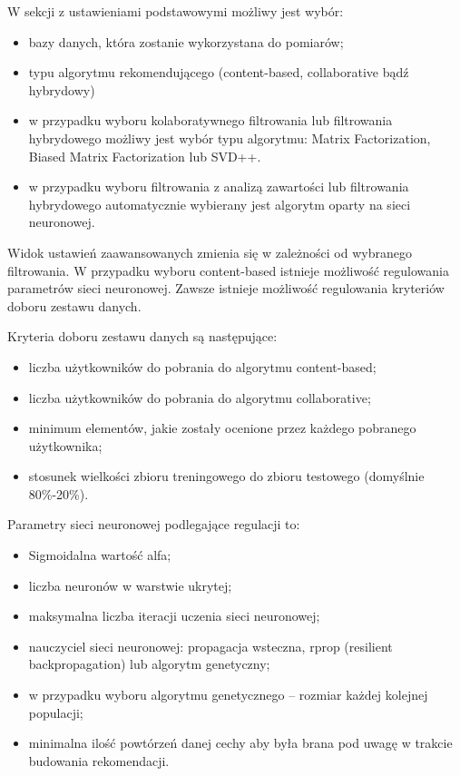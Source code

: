 \documentclass[twoside]{iisthesis}
\begin{document}
		W sekcji z ustawieniami podstawowymi możliwy jest wybór:
		\begin{itemize}
			\item bazy danych, która zostanie wykorzystana do pomiarów;
			\item typu algorytmu rekomendującego (content-based, collaborative bądź hybrydowy)
			\item w przypadku wyboru kolaboratywnego filtrowania lub filtrowania hybrydowego możliwy jest wybór typu algorytmu: Matrix Factorization, Biased Matrix Factorization lub SVD++.
			\item w przypadku wyboru filtrowania z analizą zawartości lub filtrowania hybrydowego automatycznie wybierany jest algorytm oparty na sieci neuronowej. 
		\end{itemize}
		 
		 Widok ustawień zaawansowanych zmienia się w zależności od wybranego filtrowania. W przypadku wyboru content-based istnieje możliwość regulowania parametrów sieci neuronowej. Zawsze istnieje możliwość regulowania kryteriów doboru zestawu danych.
		 
		 Kryteria doboru zestawu danych są następujące:
		 
		 \begin{itemize}
		 	\item liczba użytkowników do pobrania do algorytmu content-based;
		 	\item liczba użytkowników do pobrania do algorytmu collaborative;
		 	\item minimum elementów, jakie zostały ocenione przez każdego pobranego użytkownika;
		 	\item stosunek wielkości zbioru treningowego do zbioru testowego (domyślnie 80\%-20\%).
		 \end{itemize}
		 
		 Parametry sieci neuronowej podlegające regulacji to:
		 
		 \begin{itemize}
		 	\item Sigmoidalna wartość alfa;
		 	\item liczba neuronów w warstwie ukrytej;
		 	\item maksymalna liczba iteracji uczenia sieci neuronowej;
		 	\item nauczyciel sieci neuronowej: propagacja wsteczna, rprop (resilient backpropagation) lub algorytm genetyczny;
		 	\item w przypadku wyboru algorytmu genetycznego -- rozmiar każdej kolejnej populacji;
		 	\item minimalna ilość powtórzeń  danej cechy aby była brana pod uwagę w trakcie budowania rekomendacji.
		 \end{itemize}	 
		
\end{document}
